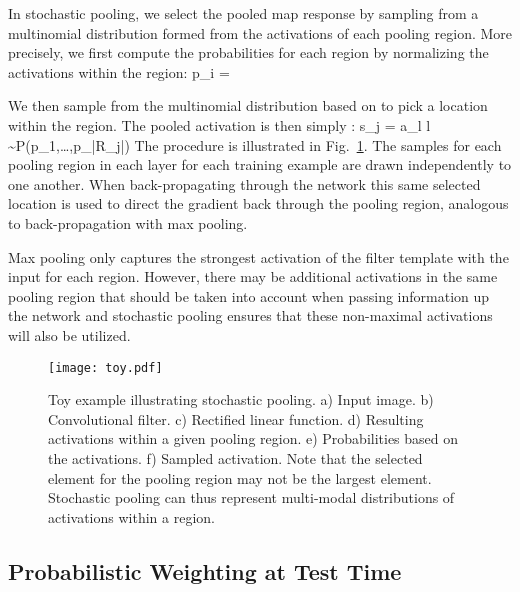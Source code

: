 \documentclass{article} \usepackage{nips12submit_e,times}
\def\BE{\vspace{-0.0mm}}
\newcommand{\fig}[1]{Fig.~\ref{fig:#1}}
\begin{document}
In stochastic pooling, we select the pooled map response by sampling
from a multinomial distribution formed from the activations of each
pooling region. More precisely, we first compute the probabilities 
for each region  by normalizing the activations within the
region:
\BE
p_i = 
\label{eqn:multinomial}
\EE

We then sample from the multinomial distribution based on
 to pick a location  within the region. The pooled activation is
then simply :
\BE
 s_j = a_l \:\:\:  \:\: l \sim P(p_1,\ldots,p_{|R_j|})
\EE
The procedure is illustrated in \fig{toy}. The samples for each
pooling region in each layer for each training example are drawn
independently to one another. When back-propagating through the network
this same selected location  is used to direct the gradient back
through the pooling region, analogous to back-propagation with max pooling.










Max pooling only captures the strongest activation of the filter
template with the input for each region. However, there may be
additional activations in the same pooling region that should be taken
into account when passing information up the network and stochastic
pooling ensures that these non-maximal activations will also be utilized.




\begin{figure}[h!]
\begin{center}
\texttt{[image: toy.pdf]}
\end{center}
\vspace*{-0.2cm}
\caption{Toy example illustrating stochastic pooling. a) Input image. b)
  Convolutional filter. c) Rectified linear function. d) Resulting activations within a given pooling region. e) Probabilities based
  on the activations. f) Sampled activation. Note that the selected
  element for the pooling region may not be the largest
  element. Stochastic pooling can thus represent multi-modal
  distributions of activations within a region.}
\label{fig:toy}
\vspace*{-0.2cm}
\end{figure}


\subsection{Probabilistic Weighting at Test Time}
\end{document}
